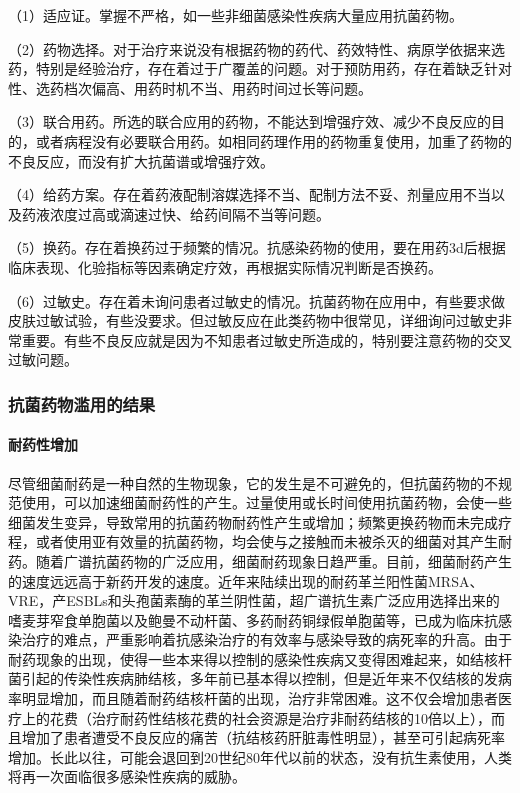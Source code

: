 （1）适应证。掌握不严格，如一些非细菌感染性疾病大量应用抗菌药物。

（2）药物选择。对于治疗来说没有根据药物的药代、药效特性、病原学依据来选药，特别是经验治疗，存在着过于广覆盖的问题。对于预防用药，存在着缺乏针对性、选药档次偏高、用药时机不当、用药时间过长等问题。

（3）联合用药。所选的联合应用的药物，不能达到增强疗效、减少不良反应的目的，或者病程没有必要联合用药。如相同药理作用的药物重复使用，加重了药物的不良反应，而没有扩大抗菌谱或增强疗效。

（4）给药方案。存在着药液配制溶媒选择不当、配制方法不妥、剂量应用不当以及药液浓度过高或滴速过快、给药间隔不当等问题。

（5）换药。存在着换药过于频繁的情况。抗感染药物的使用，要在用药3d后根据临床表现、化验指标等因素确定疗效，再根据实际情况判断是否换药。

（6）过敏史。存在着未询问患者过敏史的情况。抗菌药物在应用中，有些要求做皮肤过敏试验，有些没要求。但过敏反应在此类药物中很常见，详细询问过敏史非常重要。有些不良反应就是因为不知患者过敏史所造成的，特别要注意药物的交叉过敏问题。

\subsubsection{抗菌药物滥用的结果}
\paragraph{耐药性增加}

尽管细菌耐药是一种自然的生物现象，它的发生是不可避免的，但抗菌药物的不规范使用，可以加速细菌耐药性的产生。过量使用或长时间使用抗菌药物，会使一些细菌发生变异，导致常用的抗菌药物耐药性产生或增加；频繁更换药物而未完成疗程，或者使用亚有效量的抗菌药物，均会使与之接触而未被杀灭的细菌对其产生耐药。随着广谱抗菌药物的广泛应用，细菌耐药现象日趋严重。目前，细菌耐药产生的速度远远高于新药开发的速度。近年来陆续出现的耐药革兰阳性菌MRSA、VRE，产ESBLs和头孢菌素酶的革兰阴性菌，超广谱抗生素广泛应用选择出来的嗜麦芽窄食单胞菌以及鲍曼不动杆菌、多药耐药铜绿假单胞菌等，已成为临床抗感染治疗的难点，严重影响着抗感染治疗的有效率与感染导致的病死率的升高。由于耐药现象的出现，使得一些本来得以控制的感染性疾病又变得困难起来，如结核杆菌引起的传染性疾病肺结核，多年前已基本得以控制，但是近年来不仅结核的发病率明显增加，而且随着耐药结核杆菌的出现，治疗非常困难。这不仅会增加患者医疗上的花费（治疗耐药性结核花费的社会资源是治疗非耐药结核的10倍以上），而且增加了患者遭受不良反应的痛苦（抗结核药肝脏毒性明显），甚至可引起病死率增加。长此以往，可能会退回到20世纪80年代以前的状态，没有抗生素使用，人类将再一次面临很多感染性疾病的威胁。
